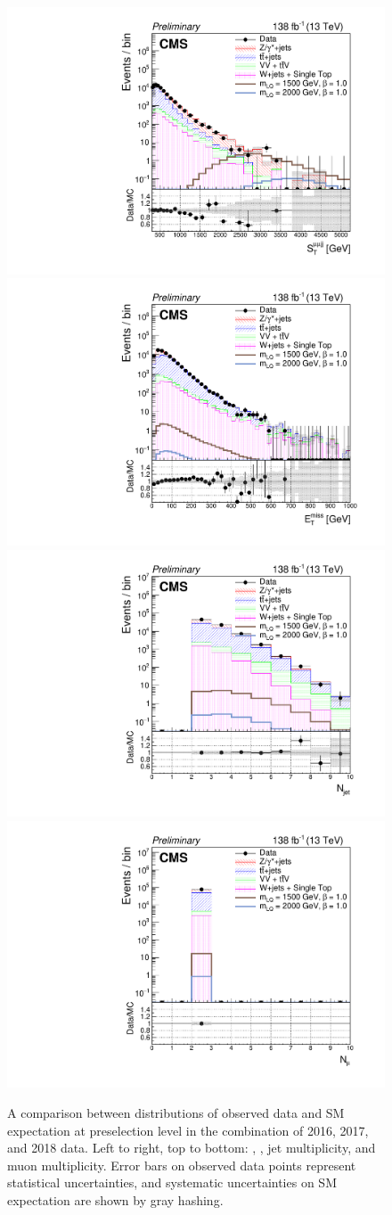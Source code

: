 \begin{figure}[H]
       \centering
       {\includegraphics[width=.49\textwidth]{Images/Analysis/Results_combined_Unblinded/Plots/Preselection/BasicLQ_uujj_St_uujj_standard.pdf}}
       {\includegraphics[width=.49\textwidth]{Images/Analysis/Results_combined_Unblinded/Plots/Preselection/BasicLQ_uujj_Pt_miss_standard.pdf}}
       {\includegraphics[width=.49\textwidth]{Images/Analysis/Results_combined_Unblinded/Plots/Preselection/BasicLQ_uujj_JetCount_standard.pdf}}
       {\includegraphics[width=.49\textwidth]{Images/Analysis/Results_combined_Unblinded/Plots/Preselection/BasicLQ_uujj_MuonCount_standard.pdf}}
       \caption{A comparison between distributions of observed data and SM expectation at preselection level in the combination of 2016, 2017, and 2018 data. Left to right, top to bottom: \ST, \ptmiss, jet multiplicity, and muon multiplicity. Error bars on observed data points represent statistical uncertainties, and systematic uncertainties on SM expectation are shown by gray hashing.}
    \label{fig:preselmiscCombined}
\end{figure}

